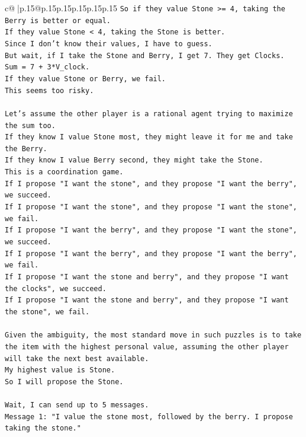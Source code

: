\documentclass{article}
\begin{document}
{\begin{supertabular}{c@{$\;$}|p{.15\linewidth}@{}p{.15\linewidth}p{.15\linewidth}p{.15\linewidth}p{.15\linewidth}p{.15\linewidth}}
{{{\texttt{So if they value Stone >= 4, taking the Berry is better or equal.} \\
\texttt{If they value Stone < 4, taking the Stone is better.} \\
\texttt{Since I don't know their values, I have to guess.} \\
\texttt{But wait, if I take the Stone and Berry, I get 7. They get Clocks.} \\
\texttt{Sum = 7 + 3*V\_clock.} \\
\texttt{If they value Stone or Berry, we fail.} \\
\texttt{This seems too risky.} \\
\\ 
\texttt{Let's assume the other player is a rational agent trying to maximize the sum too.} \\
\texttt{If they know I value Stone most, they might leave it for me and take the Berry.} \\
\texttt{If they know I value Berry second, they might take the Stone.} \\
\texttt{This is a coordination game.} \\
\texttt{If I propose "I want the stone", and they propose "I want the berry", we succeed.} \\
\texttt{If I propose "I want the stone", and they propose "I want the stone", we fail.} \\
\texttt{If I propose "I want the berry", and they propose "I want the stone", we succeed.} \\
\texttt{If I propose "I want the berry", and they propose "I want the berry", we fail.} \\
\texttt{If I propose "I want the stone and berry", and they propose "I want the clocks", we succeed.} \\
\texttt{If I propose "I want the stone and berry", and they propose "I want the stone", we fail.} \\
\\ 
\texttt{Given the ambiguity, the most standard move in such puzzles is to take the item with the highest personal value, assuming the other player will take the next best available.} \\
\texttt{My highest value is Stone.} \\
\texttt{So I will propose the Stone.} \\
\\ 
\texttt{Wait, I can send up to 5 messages.} \\
\texttt{Message 1: "I value the stone most, followed by the berry. I propose taking the stone."} \\
}}}
\end{supertabular}}
\end{document}
